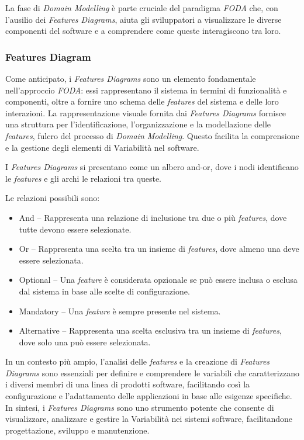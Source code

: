 \documentclass[12pt]{report}
\newcommand{\foda}{\textsl{FODA}\xspace}
\begin{document}
La fase di \textit{Domain Modelling} è parte cruciale del paradigma \foda che, con l'ausilio dei \textit{Features Diagrams}, aiuta gli sviluppatori a visualizzare le diverse componenti del software e a comprendere come queste interagiscono tra loro.


\subsubsection{Features Diagram}
\label{sec:features_diagram}
Come anticipato, i \textit{Features Diagrams} sono un elemento fondamentale nell'approccio \foda: essi rappresentano il sistema in termini di funzionalità e componenti, oltre a fornire uno schema delle \textit{features} del sistema e delle loro interazioni. La rappresentazione visuale fornita dai \textit{Features Diagrams} fornisce una struttura per l'identificazione, l'organizzazione e la modellazione delle \textit{features}, fulcro del processo di \textit{Domain Modelling}. Questo facilita la comprensione e la gestione degli elementi di Variabilità nel software.

I \textit{Features Diagrams} si presentano come un albero and-or, dove i nodi identificano le \textit{features} e gli archi le relazioni tra queste.

Le relazioni possibili sono:

\begin{itemize}
\item \textsf{And} -- Rappresenta una relazione di inclusione tra due o più \textit{features}, dove tutte devono essere selezionate.
\item \textsf{Or} -- Rappresenta una scelta tra un insieme di \textit{features}, dove almeno una deve essere selezionata.
\item \textsf{Optional} -- Una \textit{feature} è considerata opzionale se può essere inclusa o esclusa dal sistema in base alle scelte di configurazione.
\item \textsf{Mandatory} -- Una \textit{feature} è sempre presente nel sistema.
\item \textsf{Alternative} -- Rappresenta una scelta esclusiva tra un insieme di \textit{features}, dove solo una può essere selezionata.
\end{itemize}

In un contesto più ampio, l'analisi delle \textit{features} e la creazione di \textit{Features Diagrams} sono essenziali per definire e comprendere le variabili che caratterizzano i diversi membri di una linea di prodotti software, facilitando così la configurazione e l'adattamento delle applicazioni in base alle esigenze specifiche. In sintesi, i \textit{Features Diagrams} sono uno strumento potente che consente di visualizzare, analizzare e gestire la Variabilità nei sistemi software, facilitandone progettazione, sviluppo e manutenzione.
\end{document}
